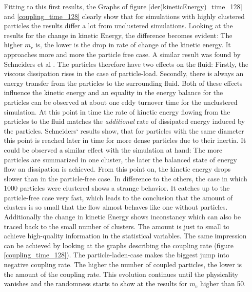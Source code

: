 \documentclass[11pt,a4paper,openany,oneside,parskip=half*]{article}
\begin{document}
\newline
Fitting to this first results, the Graphs of figure \ref{der(kineticEnergy)_time_128} and \ref{coupling_time_128} clearly show that for simulations with highly clustered particles the results differ a lot from unclustered simulations. Looking at the results for the change in kinetic Energy, the difference becomes evident: The higher $ m_\mathrm{c} $ is, the lower is the drop in rate of change of the kinetic energy. It approaches more and more the particle free case. A similar result was found by Schneiders et al \cite{Schneiders2017}. The particles therefore have two effects on the fluid: Firstly, the viscous dissipation rises in the case of particle-load. Secondly, there is always an energy transfer from the particles to the surrounding fluid. Both of these effects influence the kinetic energy and an equality in the energy balance for the particles can be observed at about one eddy turnover time for the unclustered simulation. At this point in time the rate of kinetic energy flowing from the particles to the fluid matches the \textit{additional} rate of dissipated energy induced by the particles.
\newline
Schneiders` results show, that for particles with the same diameter this point is reached later in time for more dense particles due to their inertia. It could be observed a similar effect with the simulation at hand: The more particles are summarized in one cluster, the later the balanced state of energy flow an dissipation is achieved. From this point on, the kinetic energy drops slower than in the particle-free case.
\newline
In difference to the others, the case in which 1000 particles were clustered shows a strange behavior. It catches up to the particle-free case very fast, which leads to the conclusion that the amount of clusters is so small that the flow almost behaves like one without particles. Additionally the change in kinetic Energy shows inconstancy which can also be traced back to the small number of clusters. The amount is just to small to achieve high-quality information in the statistical variables. 
\newline
The same impression can be achieved by looking at the graphs describing the coupling rate (figure \ref{coupling_time_128}). The particle-laden-case makes the biggest jump into negative coupling rate. The higher the number of coupled particles, the lower is the amount of the coupling rate. This evolution continues until the physicality vanishes and the randomness starts to show at the results for $m_\mathrm{c}$ higher than 50. 
\end{document}

